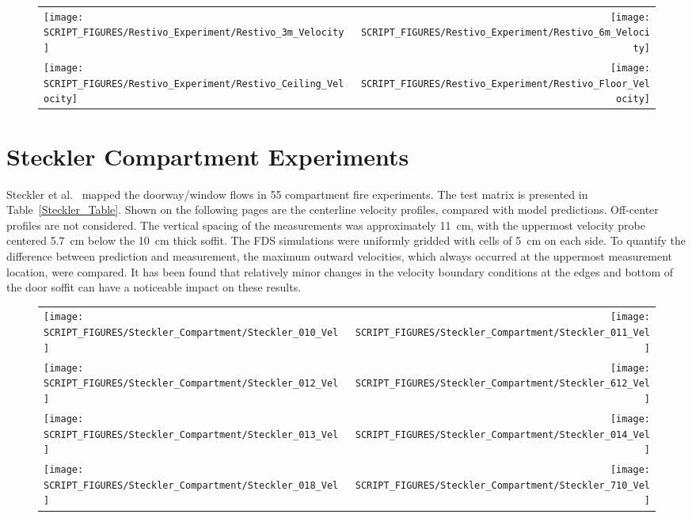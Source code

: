 \begin{figure}[h!]
\begin{tabular*}{\textwidth}{l@{\extracolsep{\fill}}r}
\texttt{[image: SCRIPT\_FIGURES/Restivo\_Experiment/Restivo\_3m\_Velocity]} &
\texttt{[image: SCRIPT\_FIGURES/Restivo\_Experiment/Restivo\_6m\_Velocity]} \\
\texttt{[image: SCRIPT\_FIGURES/Restivo\_Experiment/Restivo\_Ceiling\_Velocity]} &
\texttt{[image: SCRIPT\_FIGURES/Restivo\_Experiment/Restivo\_Floor\_Velocity]}
\end{tabular*}
\label{Restivo_Velocity}
\end{figure}

\clearpage

\section{Steckler Compartment Experiments}

Steckler et al.~\cite{Steckler:NBSIR_82-2520} mapped the doorway/window flows in 55 compartment fire experiments. The test matrix is presented in Table~\ref{Steckler_Table}. Shown on the following pages are the centerline velocity profiles, compared with model predictions. Off-center profiles are not considered. The vertical spacing of the measurements was approximately 11~cm, with the uppermost velocity probe centered 5.7~cm below the 10~cm thick soffit. The FDS simulations were uniformly gridded with cells of 5~cm on each side. To quantify the difference between prediction and measurement, the maximum outward velocities, which always occurred at the uppermost measurement location, were compared. It has been found that relatively minor changes in the velocity boundary conditions at the edges and bottom of the door soffit can have a noticeable impact on these results.

\newpage

\begin{figure}[p]
\begin{tabular*}{\textwidth}{l@{\extracolsep{\fill}}r}
\texttt{[image: SCRIPT\_FIGURES/Steckler\_Compartment/Steckler\_010\_Vel]} &
\texttt{[image: SCRIPT\_FIGURES/Steckler\_Compartment/Steckler\_011\_Vel]} \\
\texttt{[image: SCRIPT\_FIGURES/Steckler\_Compartment/Steckler\_012\_Vel]} &
\texttt{[image: SCRIPT\_FIGURES/Steckler\_Compartment/Steckler\_612\_Vel]} \\
\texttt{[image: SCRIPT\_FIGURES/Steckler\_Compartment/Steckler\_013\_Vel]} &
\texttt{[image: SCRIPT\_FIGURES/Steckler\_Compartment/Steckler\_014\_Vel]} \\
\texttt{[image: SCRIPT\_FIGURES/Steckler\_Compartment/Steckler\_018\_Vel]} &
\texttt{[image: SCRIPT\_FIGURES/Steckler\_Compartment/Steckler\_710\_Vel]}
\end{tabular*}
\label{Steckler_Vel_1}
\end{figure}

